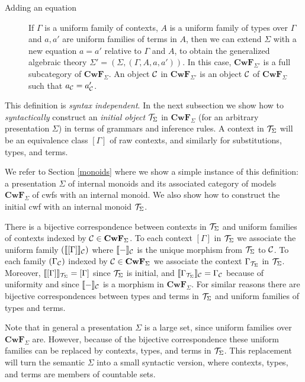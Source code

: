 \documentclass{lmcs}
\newcommand{\FYI}[1]{{\color{red}#1}}
\def\Cwf{\mathbf{CwF}}
\begin{document}
\begin{definition}
\begin{description}
\item[Adding an equation]
  If $\Gamma$ is a uniform family of contexts,
  $A$ is a uniform family of types over $\Gamma$
  and $a,a'$ are uniform families of terms in $A$,
  then we can extend $\Sigma$ with a new equation $a = a'$ relative to $\Gamma$ and $A$, to obtain
  the generalized algebraic theory $\Sigma' = (\Sigma,(\Gamma,A,a,a'))$.
  In this case,
  $\Cwf_{\Sigma'}$ is a full subcategory of $\Cwf_{\Sigma}$. An object ${\mathcal C}$ in
  $\Cwf_{\Sigma'}$ is an object ${\mathcal C}$ of $\Cwf_\Sigma$ such that $a_{{\mathcal C}} = a'_{{\mathcal C}}$.
\end{description}

\end{definition}

This definition is {\em syntax independent}. In the next subsection we show how to {\em syntactically} construct an {\em initial object} ${\mathcal T}_{\Sigma}$ in $\Cwf_{\Sigma}$ (for an arbitrary \FYI{presentation} $\Sigma$) in terms of grammars and inference rules. A context in ${\mathcal T}_{\Sigma}$ will be an equivalence class $[ \Gamma ]$ of raw contexts, and similarly for substitutions, types, and terms.

We refer to Section \ref{monoids} where we show a simple instance of this definition: a \FYI{presentation} $\Sigma$ of internal monoids and its associated category of models $\Cwf_\Sigma$ of cwfs with an internal monoid. We also show how to construct the initial cwf with an internal monoid ${\mathcal T}_\Sigma$.

\begin{remark}
There is a bijective correspondence between contexts in ${\mathcal T}_\Sigma$ and uniform families of contexts
indexed by $\C \in \Cwf_\Sigma$. To each context $[ \Gamma ]$ in ${\mathcal T}_\Sigma$ we associate the uniform family $(\llbracket  [ \Gamma ]  \rrbracket_{\mathcal C})$ where $\llbracket - \rrbracket_{\mathcal C}$ is the unique morphism from ${\mathcal T}_\Sigma$ to ${\mathcal C}$. To each family $(\Gamma_{\mathcal C})$ indexed by $\C \in \Cwf_\Sigma$ we associate the context $\Gamma_{{\mathcal T}_\Sigma}$ in ${\mathcal T}_\Sigma$. Moreover, $\llbracket  [ \Gamma ]  \rrbracket_{{\mathcal T}_\Sigma} = [ \Gamma ]$ since ${\mathcal T}_\Sigma$ is initial, and  $\llbracket  {\Gamma_{{\mathcal T}_\Sigma}} \rrbracket_{\mathcal C}  = \Gamma_{\mathcal C}$ because of uniformity and since $\llbracket - \rrbracket_{\mathcal C}$ is a morphism in $\Cwf_{\Sigma}$. For similar reasons there are bijective correspondences between types and terms in ${\mathcal T}_\Sigma$ and uniform families of types and terms.
\end{remark}

\begin{remark}
Note that in general a \FYI{presentation} $\Sigma$ is a large set, since uniform families over $\Cwf_\Sigma$ are. However, because of the bijective correspondence these uniform families can be replaced by contexts, types, and terms in ${\mathcal T}_\Sigma$. This replacement will turn the semantic $\Sigma$ into a small syntactic version, where contexts, types, and terms are members of countable sets.
\end{remark}
\end{document}
